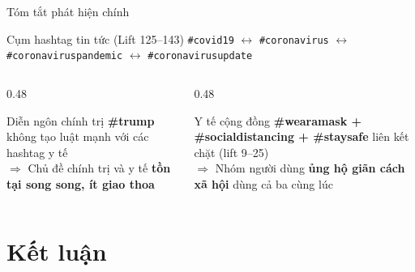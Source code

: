 \documentclass[aspectratio=169]{beamer}
\begin{document}
\begin{frame}{Tóm tắt phát hiện chính}
  \begin{block}{Cụm hashtag tin tức (Lift 125--143)}
    \centering
    \Large
    \texttt{\#covid19} $\longleftrightarrow$ \texttt{\#coronavirus} $\longleftrightarrow$ \texttt{\#coronaviruspandemic} $\longleftrightarrow$ \texttt{\#coronavirusupdate}
  \end{block}

  \vspace{0.5em}

  \begin{columns}[T]
    \begin{column}{0.48\textwidth}
      \begin{block}{Diễn ngôn chính trị}
        \textbf{\#trump} không tạo luật mạnh với các hashtag y tế\\
        $\Rightarrow$ Chủ đề chính trị và y tế \textbf{tồn tại song song, ít giao thoa}
      \end{block}
    \end{column}
    \begin{column}{0.48\textwidth}
      \begin{block}{Y tế cộng đồng}
        \textbf{\#wearamask + \#socialdistancing + \#staysafe} liên kết chặt (lift 9--25)\\
        $\Rightarrow$ Nhóm người dùng \textbf{ủng hộ giãn cách xã hội} dùng cả ba cùng lúc
      \end{block}
    \end{column}
  \end{columns}
\end{frame}

\section{Kết luận}
\end{document}
